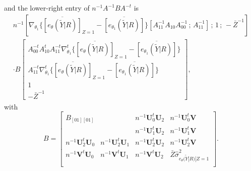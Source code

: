 \documentclass[12pt]{article}
\begin{document}
and the lower-right entry of $n^{-1} A^{-1} B A^{-t}$ is 
\begin{align*}
n^{-1}\left[ \nabla_{\theta_{1}} \{
      \overline{[e_{\theta}(\tilde{Y} | R)]}_{Z=1} -
    \overline{[e_{\theta_{1}}(\tilde{Y} | R)]}\}  [ A_{11}^{-1}  
    A_{10} A_{00}^{-1} \, ; \,  A_{11}^{-1} ] \, ; \,
1 \, ; \,  - \bar{Z}^{-1} \right] \\
\cdot B \left[
  \begin{array}{c}
    A_{00}^{-t} A_{10}^{t} A_{11}^{-t} \nabla_{\theta_{1}}^{t} \{
      \overline{[e_{\theta}(\tilde{Y} | R)]}_{Z=1} -
    \overline{[e_{\theta_{1}}(\tilde{Y} | R)]}\}   \\  A_{11}^{-t} \nabla_{\theta_{1}}^{t} \{
      \overline{[e_{\theta}(\tilde{Y} | R)]}_{Z=1} -
    \overline{[e_{\theta_{1}}(\tilde{Y} | R)]}\}  \\
1 \\  - \bar{Z}^{-1}
  \end{array}
\right]  ,
\end{align*}
with
\begin{equation*}
  B= \left[
    \begin{array}{cccc}
      B_{[01][01]} &  & n^{-1}\mathbf{U}_{0}^{t}\mathbf{U}_{2} &
                                                                 n^{-1}\mathbf{U}_{0}^{t}
                                                                 \mathbf{V} \\ 
      &  & n^{-1} \mathbf{U}_{1}^{t} \mathbf{U}_{2} &
                                                          n^{-1}\mathbf{U}_{1}^{t}\mathbf{V}
      \\
     n^{-1} \mathbf{U}_{2}^{t}\mathbf{U}_{0} & n^{-1}
                                                \mathbf{U}_{2}^{t}\mathbf{U}_{1}
                                                        & n^{-1}
                                                \mathbf{U}_{2}^{t}\mathbf{U}_{2}
                                                               &
                                                                 n^{-1}\mathbf{U}_{2}^{t} \mathbf{V}
      \\
     n^{-1}\mathbf{V}^{t}\mathbf{U}_{0} &
                                              n^{-1}\mathbf{V}^{t}\mathbf{U}_{1}
                                                        &
                                                          n^{-1}\mathbf{V}^{t}
                                                          \mathbf{U}_{2}
      &\bar{Z} \hat{\sigma}^{2}_{ e_{\theta}(\tilde{Y}|R) | Z=1}\\
    \end{array}
\right] .
\end{equation*}
\end{document}
